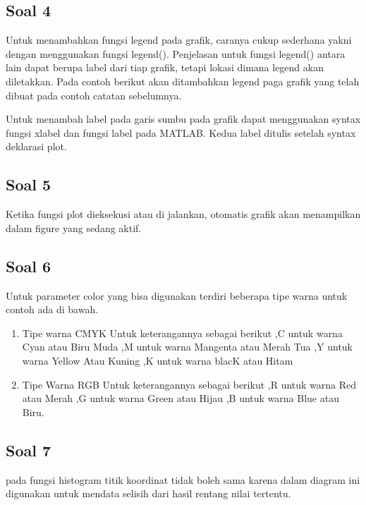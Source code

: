 	\subsection{Soal 4}
Untuk menambahkan fungsi legend pada grafik, caranya cukup sederhana yakni dengan menggunakan fungsi legend(). Penjelasan untuk fungsi legend() antara lain dapat berupa label dari tiap grafik, tetapi lokasi dimana legend akan diletakkan. Pada contoh berikut akan ditambahkan legend paga grafik yang telah dibuat pada contoh catatan sebelumnya.




Untuk menambah label pada garis sumbu pada grafik dapat menggunakan syntax fungsi xlabel dan fungsi label pada MATLAB. Kedua label ditulis setelah syntax deklarasi plot.


	\subsection{Soal 5}
	Ketika fungsi plot dieksekusi atau di jalankan, otomatis grafik akan menampilkan dalam figure yang sedang aktif. 


	\subsection{Soal 6}
Untuk parameter color yang bisa digunakan terdiri beberapa tipe warna untuk contoh ada di bawah.
\begin{enumerate}
 	\item Tipe warna CMYK
    Untuk keterangannya sebagai berikut
    ,C untuk warna Cyan atau Biru Muda
    ,M untuk warna Mangenta atau Merah Tua
    ,Y untuk warna Yellow Atau Kuning
    ,K untuk warna blacK atau Hitam

    \item Tipe Warna RGB
    Untuk keterangannya sebagai berikut
    ,R untuk warna Red atau Merah
    ,G untuk warna Green atau Hijau
    ,B untuk warna Blue atau Biru.
   
\end{enumerate}

	\subsection{Soal 7}
	pada fungsi histogram titik koordinat tidak boleh sama karena dalam diagram ini digunakan untuk 		    mendata selisih dari hasil rentang nilai tertentu.

